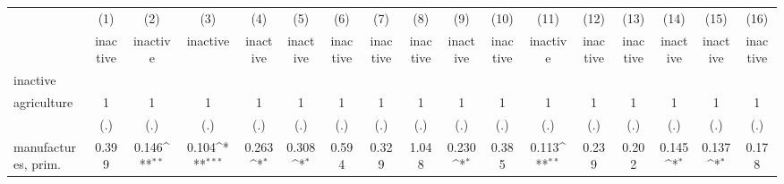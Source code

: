 {
\def\sym#1{\ifmmode^{#1}\else\(^{#1}\)\fi}
\begin{tabular}{l*{16}{c}}
\hline\hline
                    &\multicolumn{1}{c}{(1)}&\multicolumn{1}{c}{(2)}&\multicolumn{1}{c}{(3)}&\multicolumn{1}{c}{(4)}&\multicolumn{1}{c}{(5)}&\multicolumn{1}{c}{(6)}&\multicolumn{1}{c}{(7)}&\multicolumn{1}{c}{(8)}&\multicolumn{1}{c}{(9)}&\multicolumn{1}{c}{(10)}&\multicolumn{1}{c}{(11)}&\multicolumn{1}{c}{(12)}&\multicolumn{1}{c}{(13)}&\multicolumn{1}{c}{(14)}&\multicolumn{1}{c}{(15)}&\multicolumn{1}{c}{(16)}\\
                    &\multicolumn{1}{c}{inactive}&\multicolumn{1}{c}{inactive}&\multicolumn{1}{c}{inactive}&\multicolumn{1}{c}{inactive}&\multicolumn{1}{c}{inactive}&\multicolumn{1}{c}{inactive}&\multicolumn{1}{c}{inactive}&\multicolumn{1}{c}{inactive}&\multicolumn{1}{c}{inactive}&\multicolumn{1}{c}{inactive}&\multicolumn{1}{c}{inactive}&\multicolumn{1}{c}{inactive}&\multicolumn{1}{c}{inactive}&\multicolumn{1}{c}{inactive}&\multicolumn{1}{c}{inactive}&\multicolumn{1}{c}{inactive}\\
\hline
inactive            &                     &                     &                     &                     &                     &                     &                     &                     &                     &                     &                     &                     &                     &                     &                     &                     \\
agriculture         &           1         &           1         &           1         &           1         &           1         &           1         &           1         &           1         &           1         &           1         &           1         &           1         &           1         &           1         &           1         &           1         \\
                    &         (.)         &         (.)         &         (.)         &         (.)         &         (.)         &         (.)         &         (.)         &         (.)         &         (.)         &         (.)         &         (.)         &         (.)         &         (.)         &         (.)         &         (.)         &         (.)         \\
[1em]
manufactures, prim. &       0.399         &       0.146\sym{**} &       0.104\sym{***}&       0.263\sym{*}  &       0.308\sym{*}  &       0.594         &       0.329         &       1.048         &       0.230\sym{*}  &       0.385         &       0.113\sym{**} &       0.239         &       0.202         &       0.145\sym{*}  &       0.137\sym{*}  &       0.178         \\

\end{tabular}}
